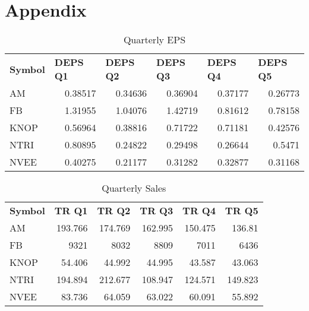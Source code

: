 \documentclass{article}
\begin{document}
\section{Appendix}
\begin{table}[htbp]
  \caption{Quarterly EPS}
   \begin{tabular}{lrrrrr}
    \textbf{Symbol} & \multicolumn{1}{l}{\textbf{DEPS Q1}} & \multicolumn{1}{l}{\textbf{DEPS Q2}} & \multicolumn{1}{l}{\textbf{DEPS Q3}} & \multicolumn{1}{l}{\textbf{DEPS Q4}} & \multicolumn{1}{l}{\textbf{DEPS Q5}} \\
    AM    & 0.38517 & 0.34636 & 0.36904 & 0.37177 & 0.26773 \\
    FB    & 1.31955 & 1.04076 & 1.42719 & 0.81612 & 0.78158 \\
    KNOP  & 0.56964 & 0.38816 & 0.71722 & 0.71181 & 0.42576 \\
    NTRI  & 0.80895 & 0.24822 & 0.29498 & 0.26644 & 0.5471 \\
    NVEE  & 0.40275 & 0.21177 & 0.31282 & 0.32877 & 0.31168 \\
    \end{tabular}%
  \label{tab:addlabel}%
\end{table}%


\begin{table}[htbp]
  \caption{Quarterly Sales}
    \begin{tabular}{lrrrrr}
    \textbf{Symbol} & \multicolumn{1}{l}{\textbf{TR Q1}} & \multicolumn{1}{l}{\textbf{TR Q2}} & \multicolumn{1}{l}{\textbf{TR Q3}} & \multicolumn{1}{l}{\textbf{TR Q4}} & \multicolumn{1}{l}{\textbf{TR Q5}} \\
    AM    & 193.766 & 174.769 & 162.995 & 150.475 & 136.81 \\
    FB    & 9321  & 8032  & 8809  & 7011  & 6436 \\
    KNOP  & 54.406 & 44.992 & 44.995 & 43.587 & 43.063 \\
    NTRI  & 194.894 & 212.677 & 108.947 & 124.571 & 149.823 \\
    NVEE  & 83.736 & 64.059 & 63.022 & 60.091 & 55.892 \\
    \end{tabular}%
  \label{tab:addlabel}%
\end{table}%
\end{document}
